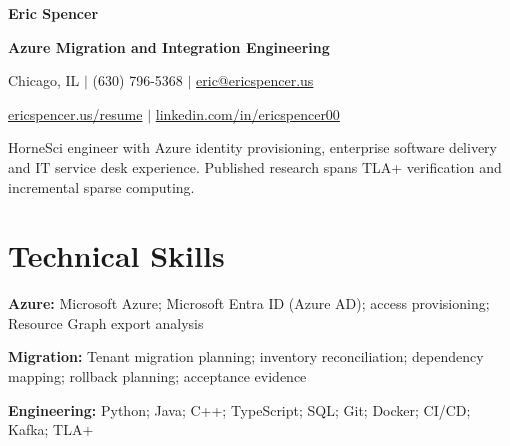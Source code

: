 \documentclass[letterpaper,10pt]{article}
\begin{document}
\fontsize{10}{11.4}\selectfont

{\fontsize{24}{27}\selectfont\bfseries Eric Spencer}\par
{\fontsize{11}{13}\selectfont\bfseries Azure Migration and Integration Engineering}\par
{\fontsize{9.2}{10.5}\selectfont Chicago, IL $|$ (630) 796-5368 $|$ \href{mailto:eric@ericspencer.us}{eric@ericspencer.us}}\par
{\fontsize{9.2}{10.5}\selectfont \href{https://ericspencer.us/resume}{ericspencer.us/resume} $|$ \href{https://linkedin.com/in/ericspencer00}{linkedin.com/in/ericspencer00}}\par
\vspace{3pt}HorneSci engineer with Azure identity provisioning, enterprise software delivery and IT service desk experience. Published research spans TLA+ verification and incremental sparse computing.\par
\section*{Technical Skills}
\textbf{Azure:} Microsoft Azure; Microsoft Entra ID (Azure AD); access provisioning; Resource Graph export analysis\par
\textbf{Migration:} Tenant migration planning; inventory reconciliation; dependency mapping; rollback planning; acceptance evidence\par
\textbf{Engineering:} Python; Java; C++; TypeScript; SQL; Git; Docker; CI/CD; Kafka; TLA+\par
\end{document}
